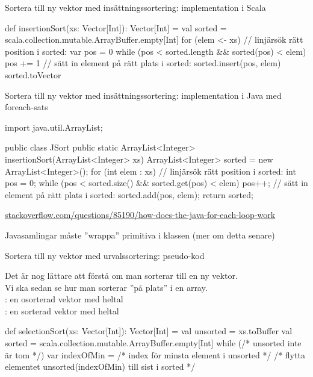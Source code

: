 \begin{Slide}{Sortera till ny vektor med insättningssortering: implementation i Scala}
\begin{Code}
def insertionSort(xs: Vector[Int]): Vector[Int] = {
  val sorted = scala.collection.mutable.ArrayBuffer.empty[Int]
  for (elem <- xs) {
     // linjärsök rätt position i sorted:
     var pos = 0
     while (pos < sorted.length && sorted(pos) < elem) {
       pos += 1
     }
     // sätt in element på rätt plats i sorted:
     sorted.insert(pos, elem)
  }
  sorted.toVector
}
\end{Code}
\end{Slide}

\begin{Slide}{Sortera till ny vektor med insättningssortering: implementation i Java med foreach-sats}
\SlideFontTiny\vspace{-0.5em}
\begin{Code}[language=Java]
import java.util.ArrayList;

public class JSort {
    public static ArrayList<Integer> insertionSort(ArrayList<Integer> xs) {
        ArrayList<Integer> sorted = new ArrayList<Integer>();
        for (int elem : xs) {
            // linjärsök rätt position i sorted:
            int pos = 0;
            while (pos < sorted.size() && sorted.get(pos) < elem) {
                pos++;
            }
            // sätt in element på rätt plats i sorted:
            sorted.add(pos, elem);
        }
        return sorted;
    }
}
\end{Code}
\vspace{-0.3em}
\href{http://stackoverflow.com/questions/85190/how-does-the-java-for-each-loop-work}{ stackoverflow.com/questions/85190/how-does-the-java-for-each-loop-work}

Javasamlingar måste ''wrappa'' primitiva  i klassen  (mer om detta senare)
\end{Slide}

\begin{Slide}{Sortera till ny vektor med urvalssortering: pseudo-kod}

{\SlideFontSmall Det är nog lättare att förstå  om man sorterar till en ny vektor. \\ Vi ska sedan se hur man sorterar ''på plats''  i en  array.\\} \vspace{1em}
: en osorterad vektor med heltal \\
: en sorterad vektor med heltal
\begin{Code}
def selectionSort(xs: Vector[Int]): Vector[Int] = {
  val unsorted = xs.toBuffer
  val sorted = scala.collection.mutable.ArrayBuffer.empty[Int]
  while (/* unsorted inte är tom */) {
    var indexOfMin = /* index för minsta element i unsorted */
    /* flytta elementet unsorted(indexOfMin) till sist i sorted */
  }
}
\end{Code}
\end{Slide}

